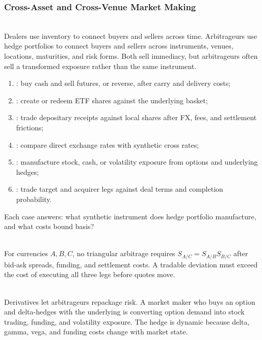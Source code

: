 \subsubsection{Cross-Asset and Cross-Venue Market Making}

\begin{principle} \\
Dealers use inventory to connect buyers and sellers across time. Arbitrageurs use hedge portfolios to connect buyers and sellers across instruments, venues, locations, maturities, and risk forms. Both sell immediacy, but arbitrageurs often sell a transformed exposure rather than the same instrument.
\end{principle}

\begin{taxonomy} 
\begin{enumerate}[label=\roman*.]
\setlength{\itemsep}{0pt}
\item {}: buy cash and sell futures, or reverse, after carry and delivery costs;
\item {}: create or redeem ETF shares against the underlying basket;
\item {}: trade depositary receipts against local shares after FX, fees, and settlement frictions;
\item {}: compare direct exchange rates with synthetic cross rates;
\item {}: manufacture stock, cash, or volatility exposure from options and underlying hedges;
\item {}: trade target and acquirer legs against deal terms and completion probability.
\end{enumerate}
Each case answers: what synthetic instrument does hedge portfolio manufacture, and what costs bound basis?
\end{taxonomy}

\begin{model} \\
For currencies $A,B,C$, no triangular arbitrage requires $S_{A/C}=S_{A/B}S_{B/C}$ after bid-ask spreads, funding, and settlement costs. A tradable deviation must exceed the cost of executing all three legs before quotes move.
\end{model}

\begin{mechanism} \\
Derivatives let arbitrageurs repackage risk. A market maker who buys an option and delta-hedges with the underlying is converting option demand into stock trading, funding, and volatility exposure. The hedge is dynamic because delta, gamma, vega, and funding costs change with market state.
\end{mechanism}

